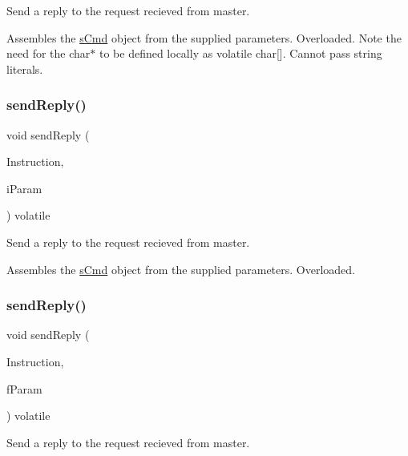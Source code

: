 Send a reply to the request recieved from master. 

Assembles the \mbox{\hyperlink{structs_cmd}{s\+Cmd}} object from the supplied parameters. Overloaded. Note the need for the char$\ast$ to be defined locally as volatile char\mbox{[}\mbox{]}. Cannot pass string literals. \mbox{\label{class_master_a26d84a77b85fdd81db98ccd23d0e882f}} 
\subsubsection{\texorpdfstring{sendReply()}{sendReply()}\hspace{0.1cm}{\footnotesize\ttfamily [4/9]}}
{\footnotesize\ttfamily void send\+Reply (\begin{DoxyParamCaption}\item[{const \mbox{\hyperlink{_s_p_i___instruction_set_8h_a949ec019a0f52780dcdd7d5a5ba73e47}{s\+Instruct}}}]{Instruction,  }\item[{const int}]{i\+Param }\end{DoxyParamCaption}) volatile}



Send a reply to the request recieved from master. 

Assembles the \mbox{\hyperlink{structs_cmd}{s\+Cmd}} object from the supplied parameters. Overloaded. \mbox{\label{class_master_a68d7ac6a3680ac2b4c3620b6e175d97f}} 
\subsubsection{\texorpdfstring{sendReply()}{sendReply()}\hspace{0.1cm}{\footnotesize\ttfamily [5/9]}}
{\footnotesize\ttfamily void send\+Reply (\begin{DoxyParamCaption}\item[{const \mbox{\hyperlink{_s_p_i___instruction_set_8h_a949ec019a0f52780dcdd7d5a5ba73e47}{s\+Instruct}}}]{Instruction,  }\item[{const float}]{f\+Param }\end{DoxyParamCaption}) volatile}



Send a reply to the request recieved from master. 

